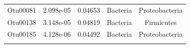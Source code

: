 \documentclass[]{article}
\begin{document}
\begin{longtable}[]{@{}ccccc@{}}
\begin{minipage}[t]{0.13\columnwidth}\centering\strut
Otu00081\strut
\end{minipage} & \begin{minipage}[t]{0.14\columnwidth}\centering\strut
2.098e-05\strut
\end{minipage} & \begin{minipage}[t]{0.13\columnwidth}\centering\strut
0.04653\strut
\end{minipage} & \begin{minipage}[t]{0.13\columnwidth}\centering\strut
Bacteria\strut
\end{minipage} & \begin{minipage}[t]{0.27\columnwidth}\centering\strut
Proteobacteria\strut
\end{minipage}\tabularnewline
\begin{minipage}[t]{0.13\columnwidth}\centering\strut
Otu00138\strut
\end{minipage} & \begin{minipage}[t]{0.14\columnwidth}\centering\strut
3.148e-05\strut
\end{minipage} & \begin{minipage}[t]{0.13\columnwidth}\centering\strut
0.04819\strut
\end{minipage} & \begin{minipage}[t]{0.13\columnwidth}\centering\strut
Bacteria\strut
\end{minipage} & \begin{minipage}[t]{0.27\columnwidth}\centering\strut
Firmicutes\strut
\end{minipage}\tabularnewline
\begin{minipage}[t]{0.13\columnwidth}\centering\strut
Otu00185\strut
\end{minipage} & \begin{minipage}[t]{0.14\columnwidth}\centering\strut
4.128e-06\strut
\end{minipage} & \begin{minipage}[t]{0.13\columnwidth}\centering\strut
0.04492\strut
\end{minipage} & \begin{minipage}[t]{0.13\columnwidth}\centering\strut
Bacteria\strut
\end{minipage} & \begin{minipage}[t]{0.27\columnwidth}\centering\strut
Proteobacteria\strut
\end{minipage}\tabularnewline
\begin{minipage}[t]{0.13\columnwidth}\centering\strut

\end{minipage}
\end{longtable}
\end{document}
